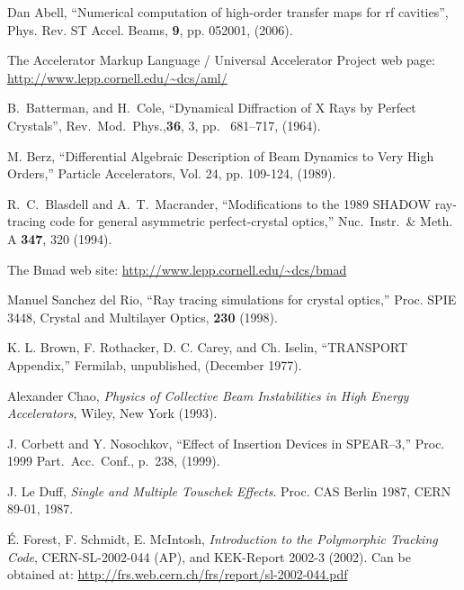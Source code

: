 \begin{thebibliography}{XXXXXXX99}

Dan Abell, ``Numerical computation of high-order transfer maps for rf cavities'',
Phys. Rev. ST Accel. Beams, {\bf 9}, pp. 052001, (2006).

The Accelerator Markup Language / Universal Accelerator Project web page:
\hfill\break
\hspace*{0.3in}
\url{http://www.lepp.cornell.edu/~dcs/aml/}

B.~Batterman, and H.~Cole,
``Dynamical Diffraction of X Rays by Perfect Crystals'',
Rev.\ Mod.\ Phys.,{\bf 36}, 3, pp.~ 681--717, (1964).

M. Berz, 
``Differential Algebraic Description of Beam Dynamics to Very High Orders,''
Particle Accelerators, Vol. 24, pp. 109-124, (1989).

R.~C.~Blasdell and A.~T.~Macrander, ``Modifications to the 1989 SHADOW
 ray-tracing code for general asymmetric perfect-crystal optics,''
Nuc.\ Instr.\ \& Meth. A {\bf 347}, 320 (1994).

The Bmad web site:
\hfill\break
\hspace*{0.3in} \url{http://www.lepp.cornell.edu/~dcs/bmad}

Manuel Sanchez del Rio, ``Ray tracing simulations for crystal optics,''
Proc. SPIE 3448, Crystal and Multilayer Optics, {\bf 230} (1998). 

K. L. Brown, F. Rothacker, D. C. Carey, and Ch. Iselin, ``TRANSPORT
Appendix,'' Fermilab, unpublished, (December 1977).

Alexander Chao, {\em Physics of Collective Beam
Instabilities in High Energy Accelerators}, Wiley, New York (1993). 

J. Corbett and Y. Nosochkov, ``Effect of Insertion Devices in SPEAR--3,''
Proc. 1999 Part.\ Acc.\ Conf., p.~238, (1999).

  J. Le Duff, \emph{Single and Multiple Touschek Effects}.
  Proc. CAS Berlin 1987,
  CERN 89-01,
  1987.

\'E. Forest, F. Schmidt, E. McIntosh, 
{\it Introduction to the Polymorphic Tracking Code}, 
CERN-SL-2002-044 (AP), and KEK-Report 2002-3 (2002). 
Can be obtained at:
\hfill\break
\hspace*{0.3in}
\url{http://frs.web.cern.ch/frs/report/sl-2002-044.pdf}


\end{thebibliography}
